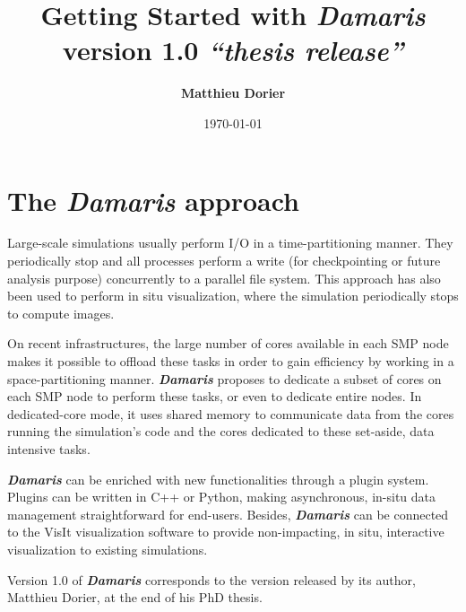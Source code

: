 \documentclass[11pt]{report}
\newcommand{\Damaris}{\emph{\textbf{Damaris}}}
\begin{document}
\title{\Huge{ 
	 Getting Started with \Damaris{}} \\
	\normalsize{} version 1.0 \emph{``thesis release''}}
\author{\textbf{Matthieu Dorier}}
\date{\today}
\maketitle

\setcounter{tocdepth}{1}
\tableofcontents

\chapter*{The \Damaris{} approach}

Large-scale simulations usually perform I/O in a time-partitioning manner.
They periodically stop and all processes perform a write (for checkpointing
or future analysis purpose) concurrently to a parallel file system. 
This approach has also been used to perform in situ visualization, 
where the simulation periodically stops to compute images.

On recent infrastructures, the large number of cores available in each SMP node makes
it possible to offload these tasks in order to gain efficiency by working 
in a space-partitioning manner.
\Damaris{} proposes to dedicate a subset of cores on each SMP node to perform these tasks,
or even to dedicate entire nodes.
In dedicated-core mode, it uses shared memory to communicate data from the cores 
running the simulation's code and the cores dedicated to these set-aside,
data intensive tasks.

\Damaris{} can be enriched with new functionalities through a plugin system. 
Plugins can be written in C++ or Python, making asynchronous, 
in-situ data management straightforward for end-users.
Besides, \Damaris{} can be connected to the VisIt visualization software to provide
non-impacting, in situ, interactive visualization to existing simulations.

Version 1.0 of \Damaris{} corresponds to the version released by its author,
Matthieu Dorier, at the end of his PhD thesis.

\end{document}
